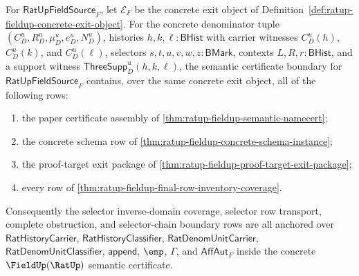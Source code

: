 \begin{theorem}
\label{thm:ratup-fieldup-final-row-inventory-semantic-certificate}
For $\mathsf{RatUpFieldSource}_F$, let $\mathcal E_F$ be the concrete exit
object of Definition~\ref{def:ratup-fieldup-concrete-exit-object}. For the
concrete denominator tuple $(C_D^u,R_D^u,\mu_D^u,e_D^u,N_D^u)$, histories
$h,k,\ell:\mathsf{BHist}$ with carrier witnesses $C_D^u(h)$, $C_D^u(k)$, and
$C_D^u(\ell)$, selectors $s,t,u,v,w,z:\mathsf{BMark}$, contexts
$L,R,r:\mathsf{BHist}$, and a support witness
$\mathsf{ThreeSupp}_D^u(h,k,\ell)$, the semantic certificate boundary for
$\mathsf{RatUpFieldSource}_F$ contains, over the same concrete exit object, all
of the following rows:
\begin{enumerate}
  \item the paper certificate assembly of
  \autoref{thm:ratup-fieldup-semantic-namecert};
  \item the concrete schema row of
  \autoref{thm:ratup-fieldup-concrete-schema-instance};
  \item the proof-target exit package of
  \autoref{thm:ratup-fieldup-proof-target-exit-package};
  \item every row of
  \autoref{thm:ratup-fieldup-final-row-inventory-coverage}.
\end{enumerate}
Consequently the selector inverse-domain coverage, selector row transport,
complete obstruction, and selector-chain boundary rows are all anchored over
$\mathsf{RatHistoryCarrier}$, $\mathsf{RatHistoryClassifier}$,
$\mathsf{RatDenomUnitCarrier}$, $\mathsf{RatDenomUnitClassifier}$,
$\mathsf{append}$, $\emp$, $\Gamma$, and $\mathsf{AffAut}_F$ inside the
concrete $\FieldUp(\RatUp)$ semantic certificate.
\end{theorem}
